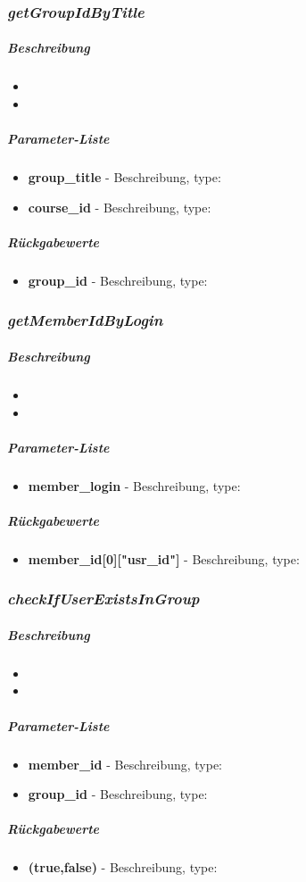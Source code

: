 \subsubsection*{\textit{getGroupIdByTitle}}\label{getGroupIdByTitleMGUI}
\subparagraph{Beschreibung}
\begin{itemize}
	\item[] \noindent{} 
	\item[] 
\end{itemize}
\subparagraph{Parameter-Liste}
\begin{itemize}
	\item[] \textbf{group\_title} - Beschreibung, type: 
	\item[] \textbf{course\_id} - Beschreibung, type:
\end{itemize}
\subparagraph{Rückgabewerte}
\begin{itemize}
	\item[] \textbf{group\_id} - Beschreibung, type:
\end{itemize}

\subsubsection*{\textit{getMemberIdByLogin}}\label{getMemberIdByLoginMGUI}
\subparagraph{Beschreibung}
\begin{itemize}
	\item[] \noindent{} 
	\item[] 
\end{itemize}
\subparagraph{Parameter-Liste}
\begin{itemize}
	\item[] \textbf{member\_login} - Beschreibung, type: 
\end{itemize}
\subparagraph{Rückgabewerte}
\begin{itemize}
	\item[] \textbf{member\_id[0]["usr\_id"]} - Beschreibung, type:
\end{itemize}

\subsubsection*{\textit{checkIfUserExistsInGroup}}\label{checkIfUserExistsInGroupMGUI}
\subparagraph{Beschreibung}
\begin{itemize}
	\item[] \noindent{} 
	\item[] 
\end{itemize}
\subparagraph{Parameter-Liste}
\begin{itemize}
	\item[] \textbf{member\_id} - Beschreibung, type: 
	\item[] \textbf{group\_id} - Beschreibung, type: 
\end{itemize}
\subparagraph{Rückgabewerte}
\begin{itemize}
	\item[] \textbf{(true,false)} - Beschreibung, type:
\end{itemize}

